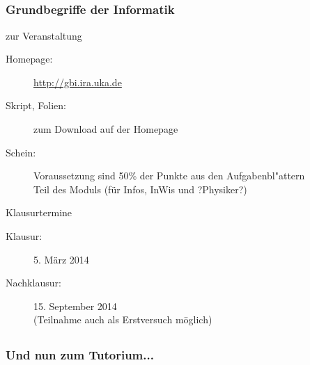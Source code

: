 \subsection*{}
\begin{frame}
        \frametitle{Grundbegriffe der Informatik}
        \begin{block}{zur Veranstaltung}
                \begin{description}
                \item[Homepage:] \url{http://gbi.ira.uka.de}
                \item[Skript, Folien:] zum Download auf der Homepage
                \item[Schein:] Voraussetzung sind 50\% der Punkte aus den Aufgabenbl"attern\\  Teil des Moduls (für Infos, InWis und ?Physiker?)
                \end{description}
        \end{block}

        \vspace{2ex}

        \begin{block}{Klausurtermine}
                \begin{description}
                  \item[Klausur:] 5. März 2014
                  \item[Nachklausur:] 15. September 2014\\
                          (Teilnahme auch als Erstversuch möglich)
                \end{description}
        \end{block}
\end{frame}

\subsection*{}
\begin{frame}
        \frametitle{Und nun zum Tutorium...}
 \end{frame}

